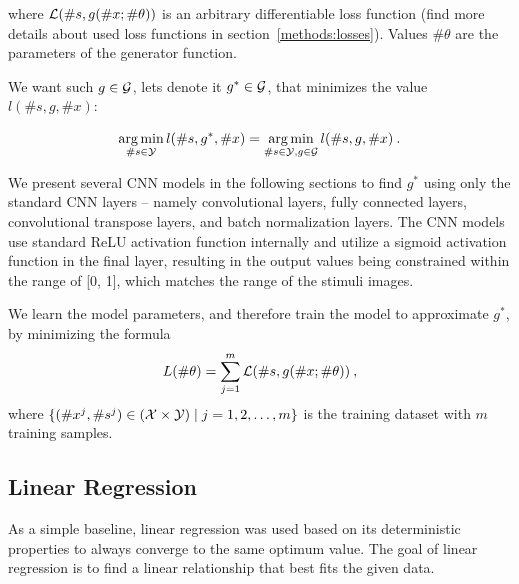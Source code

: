 where ${\cal L}(\#{s}, g(\#{x} ; \#\theta))$ is an arbitrary differentiable loss function (find more details about used loss functions in section~\ref{methods:losses}). Values $\#\theta$ are the parameters of the generator function.


We want such $g \in {\cal G}$, lets denote it $g^* \in {\cal G}$, that minimizes the value $l(\#{s},g,\#{x})$:

\begin{equation}
\operatorname*{arg\,min}_{\#{s}\in {\cal Y}}l(\#{s},g^*,\#{x}) = \operatorname*{arg\,min}_{\#{s}\in {\cal Y}, g\in {\cal G}}{l(\#{s},g,\#{x})}\:.
\end{equation}


We present several CNN models in the following sections to find $g^*$ using only the standard CNN layers -- namely convolutional layers, fully connected layers, convolutional transpose layers, and batch normalization layers. The CNN models use standard ReLU activation function internally and utilize a sigmoid activation function in the final layer, resulting in the output values being constrained within the range of [0, 1], which matches the range of the stimuli images.

We learn the model parameters, and therefore train the model to approximate $g^*$, by minimizing the formula
\begin{equation}
\label{equation:predictor-loss-minimization}
L(\#\theta) = \sum_{j=1}^m{{\cal L}(\#{s}, g(\#{x} ; \#{\theta}))}\:,
\end{equation}
where $\{(\#{x}^j, \#{s}^j) \in ({\cal X} \times {\cal Y}) \mid j=1,2,\dots,m\}$ is the training dataset with $m$ training samples.


\subsection{Linear Regression}
\label{methods:models:linear-regression}
As a simple baseline, linear regression was used based on its deterministic properties to always converge to the same optimum value. The goal of linear regression is to find a linear relationship that best fits the given data.

